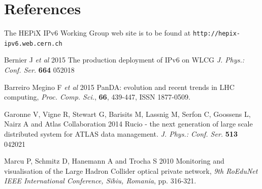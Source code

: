 \documentclass[a4paper]{jpconf}
\begin{document}
\section*{References}
\begin{thebibliography}{10}


 The HEPiX IPv6 Working Group web site is to be found at {\tt http://hepix-ipv6.web.cern.ch}

 Bernier J {\it et al} 2015 The production deployment of IPv6 on WLCG \textit{J. Phys.: Conf. Ser.} \textbf{664} 052018

 Barreiro Megino F {\it et al} 2015 PanDA: evolution and recent trends in LHC computing, \textit {Proc. Comp. Sci.}, \textbf{66}, 439-447, ISSN 1877-0509.


 Garonne V, Vigne R, Stewart G, Barisits M, Lassnig M, Serfon C, Goossens L, Nairz A and Atlas Collaboration 2014 Rucio - the next generation of large scale distributed system for ATLAS data management. \textit{J. Phys.: Conf. Ser.} \textbf{513} 042021

  Marcu P, Schmitz D, Hanemann A and Trocha S  2010 Monitoring and visualisation of the Large Hadron Collider optical private network, \textit{9th RoEduNet IEEE International Conference, Sibiu, Romania}, pp. 316-321.


\end{thebibliography}
\end{document}
